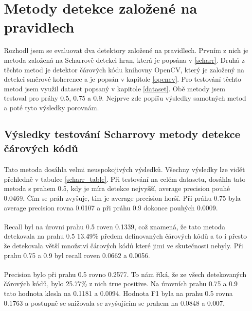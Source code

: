 \section{Metody detekce založené na pravidlech}
Rozhodl jsem se evaluovat dva detektory založené na pravidlech. Prvním z nich je metoda založená na Scharrově detekci hran, která je popsána v \ref{scharr}. Druhá z těchto metod je detektor čárových kódu knihovny OpenCV, který je založený na detekci směrové koherence a je popsán v kapitole \ref{opencv}. Pro testování těchto metod jsem využil dataset popsaný v kapitole \ref{dataset}. Obě metody jsem testoval pro práhy 0.5, 0.75 a 0.9. Nejprve zde popíšu výsledky samotných metod a poté tyto výsledky porovnám.


\subsection*{Výsledky testování Scharrovy metody detekce čárových kódů}
\label{scharr_exp}
\paragraph{}Tato metoda dosáhla velmi neuspokojivých výsledků. Všechny výsledky lze vidět přehledně v tabulce \ref{scharr_table}. Při testování na celém datasetu, dosáhla tato metoda s prahem 0.5, kdy je míra detekce nejvyšší, average precision pouhé 0.0469. Čím se práh zvyšuje, tím je average precision horší. Při práhu 0.75 byla average precision rovna 0.0107 a při práhu 0.9 dokonce pouhých 0.0009. 

\paragraph{} Recall byl na úrovni prahu 0.5 roven 0.1339, což znamená, že tato metoda detekovala na prahu 0.5 13.49\% předem definovaných čárových kódů a to i přesto že detekovala větší množství čárových kódů které jimi ve skutečnosti nebyly. Při prahu 0.75 a 0.9 byl recall roven 0.0662 a 0.0056.

\paragraph{} Precision bylo při prahu 0.5 rovno 0.2577. To nám říká, že ze všech detekovaných čárových kódů, bylo 25.77\% z nich true positive. Na úrovních prahu 0.75 a 0.9 tato hodnota klesla na 0.1181 a 0.0094. Hodnota F1 byla na prahu 0.5 rovna 0.1763 a postupně se snižovala se zvyšujícím se prahem na 0.0848 a 0.007.

